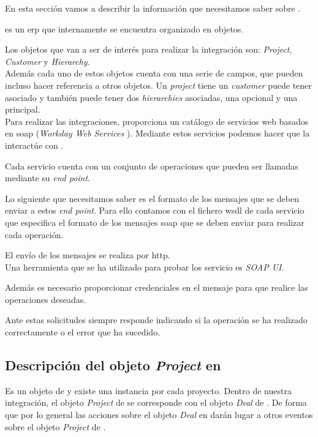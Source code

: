 En esta sección vamos a describir la información que necesitamos saber sobre \wday.

\wday{} es un \acrshort{erp} que internamente se encuentra organizado en objetos.
 
Los objetos que van a ser de interés para realizar la integración son:
\textit{Project}, \textit{Customer} y \textit{Hierarchy}.\\

Además cada uno de estos objetos cuenta con una serie de campos, que pueden incluso hacer referencia a otros objetos.
Un \textit{project} tiene un \textit{customer} puede tener asociado y también puede tener dos \textit{hierarchies} asociadas, una opcional y una principal.\\


Para realizar las integraciones, \wday{} proporciona un catálogo de servicios web basados en \acrshort{soap} (\textit{Workday Web Services} \cite{wws}). 
Mediante estos servicios podemos hacer que la \iface{} interactúe con \wday{}.

Cada servicio cuenta con un conjunto de operaciones que pueden ser llamadas mediante su \textit{end point}.


Lo siguiente que necesitamos saber es el formato de los mensajes que se deben enviar a estos \textit{end point}. Para ello contamos con el fichero \acrshort{wsdl} de cada servicio que especifica el formato de los mensajes \acrshort{soap} que se deben enviar para realizar cada operación.


El envío de los mensajes se realiza por \acrshort{http}.\\

Una herramienta que se ha utilizado para probar los servicio es \textit{SOAP UI}.

Además es necesario proporcionar credenciales en el mensaje para que \wday{} realice las operaciones deseadas.

Ante estas solicitudes \wday{} siempre responde indicando si la operación se ha realizado correctamente o el error que ha sucedido.



\subsection{Descripción del objeto \textit{Project} en \wday{}}
Es un objeto de \wday{} y existe una instancia por cada proyecto. Dentro de nuestra integración, 
el objeto \textit{Project} de \wday{} se corresponde con el objeto \textit{Deal} de \hs{}. 
De forma que por lo general las acciones sobre el objeto \textit{Deal} en \hs{} darán lugar a otros eventos
 sobre el objeto \textit{Project} de \wday{}.\\
 
